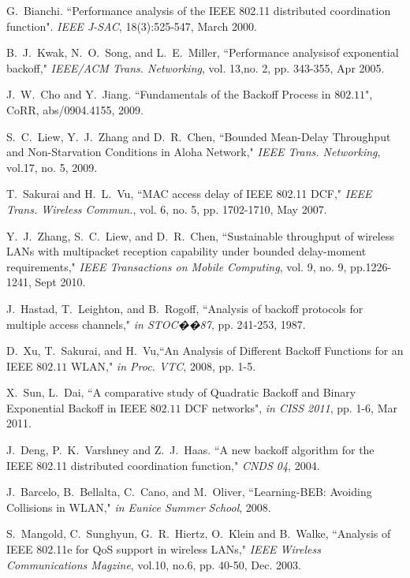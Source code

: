 \documentclass[journal]{IEEEtran}
\begin{document}
\begin{thebibliography}{1}
G.~Bianchi. ``Performance analysis of the IEEE 802.11 distributed coordination function". \emph{IEEE J-SAC}, 18(3):525-547, March 2000.

B.~J.~Kwak, N.~O.~Song, and L.~E.~Miller, ``Performance analysisof exponential backoff,"  \emph{IEEE/ACM Trans. Networking}, vol. 13,no. 2, pp. 343-355, Apr 2005.

J.~W.~Cho and Y.~Jiang. ``Fundamentals of the Backoff Process in $802.11$", CoRR, abs/0904.4155, 2009.

S.~C.~Liew, Y.~J.~Zhang and D.~R.~Chen, ``Bounded Mean-Delay Throughput and Non-Starvation Conditions in Aloha Network," \emph{IEEE Trans. Networking}, vol.17, no. 5, 2009.

T.~Sakurai and H.~L.~Vu, ``MAC access delay of IEEE 802.11 DCF,"  \emph{IEEE Trans. Wireless Commun.}, vol. 6, no. 5, pp. 1702-1710, May 2007.

Y.~J.~Zhang, S.~C.~Liew, and D.~R.~Chen, ``Sustainable throughput of wireless LANs with multipacket reception capability under bounded delay-moment requirements," \emph{IEEE Transactions on Mobile Computing}, vol. 9, no. 9, pp.1226-1241, Sept 2010.

J.~Hastad, T.~Leighton, and B.~Rogoff, ``Analysis of backoff protocols for multiple access channels," \emph{in STOC��87}, pp. 241-253, 1987.

D.~Xu, T.~Sakurai, and H.~Vu,``An Analysis of Different Backoff Functions for an IEEE $802.11$ WLAN," \emph{in Proc. VTC}, 2008, pp. 1-5.

X.~Sun, L.~Dai, ``A comparative study of Quadratic Backoff and Binary Exponential Backoff in IEEE $802.11$ DCF networks", \emph{in CISS 2011}, pp. 1-6, Mar 2011.

J.~Deng, P.~K.~Varshney and Z.~J.~Haas. ``A new backoff algorithm for the IEEE 802.11 distributed coordination function," \emph{CNDS 04}, 2004.

J.~Barcelo, B.~Bellalta, C.~Cano, and M.~Oliver, ``Learning-BEB: Avoiding Collisions in WLAN," \emph{in Eunice Summer School}, 2008.

S.~Mangold, C.~Sunghyun, G.~R.~Hiertz, O.~Klein and B.~Walke, ``Analysis of IEEE 802.11e for QoS support in wireless LANs," \emph{IEEE Wireless Communications Magzine}, vol.10, no.6, pp. 40-50, Dec. 2003.


\end{thebibliography}
\end{document}
